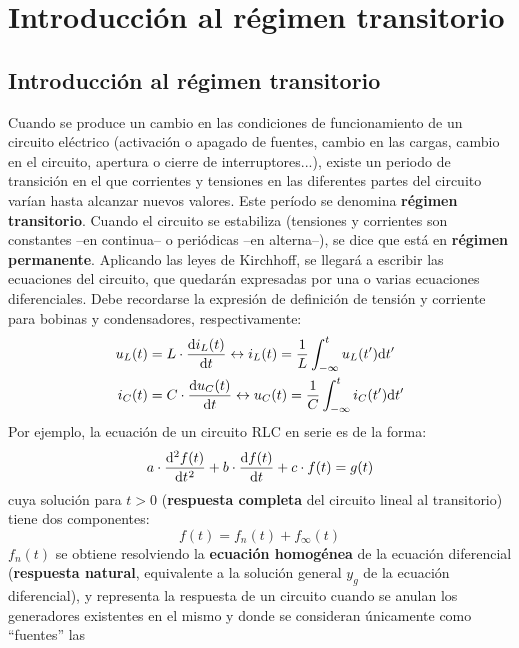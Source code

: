 \chapter{Introducción al régimen transitorio}
	
\section{Introducción al régimen transitorio}
	
Cuando se produce un cambio en las condiciones de funcionamiento de un
circuito eléctrico (activación o apagado de fuentes, cambio en las
cargas, cambio en el circuito, apertura o cierre de interruptores...),
existe un periodo de transición en el que corrientes y tensiones en
las diferentes partes del circuito varían hasta alcanzar nuevos
valores. Este período se denomina \textbf{régimen transitorio}. Cuando
el circuito se estabiliza (tensiones y corrientes son constantes --en
continua-- o periódicas --en alterna--), se dice que está en
\textbf{régimen permanente}. Aplicando las leyes de Kirchhoff, se
llegará a escribir las ecuaciones del circuito, que quedarán
expresadas por una o varias ecuaciones diferenciales. Debe recordarse
la expresión de definición de tensión y corriente para bobinas y
condensadores, respectivamente:
\begin{align*}
  u_L(t) &= L \cdot \diff{i_L(t)}{t}
           \leftrightarrow
           i_L(t) = \frac{1}{L} \int^t_{-\infty}u_L(t') \mathrm{d}t'\\
  i_C(t) &= C \cdot \diff{u_C(t)}{t}
           \leftrightarrow
           u_C(t) = \frac{1}{C} \int^t_{-\infty}i_C(t') \mathrm{d}t'
\end{align*}
Por ejemplo, la ecuación de un circuito RLC en serie es de la forma:
\begin{equation*}
  a \cdot \diff[2]{f(t)}{t} + b \cdot \diff{f(t)}{t} + c \cdot f(t) = g(t)
\end{equation*}
cuya solución para $t > 0$ (\textbf{respuesta completa} del circuito
lineal al transitorio) tiene dos componentes:
\begin{equation*}
  f(t) = f_n(t) + f_\infty(t)
\end{equation*}
$f_n(t)$ se obtiene resolviendo la \textbf{ecuación homogénea} de la
ecuación diferencial (\textbf{respuesta natural}, equivalente a la
solución general $y_g$ de la ecuación diferencial), y representa la
respuesta de un circuito cuando se anulan los generadores existentes
en el mismo y donde se consideran únicamente como ``fuentes'' las
